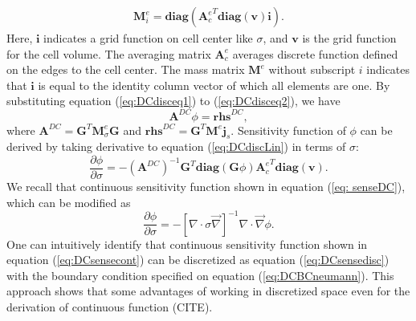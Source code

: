 \documentclass[a4paper, 11pt]{article}
\renewcommand{\div}{\nabla\cdot}
\newcommand{\grad}{\vec \nabla}
\newcommand{\dgrad}{{\mathbf G}}
\newcommand{\Ace}{{\mathbf A_c^e}}
\newcommand{\diag}{\mathbf{diag}}
\newcommand{\M}{{\mathbf M}}
\newcommand{\MeSig}{{\M^e_\sigma}}
\newcommand{\Me}{{\M^e}}
\renewcommand {\dj}  { {\mathbf{j} } }
\newcommand{\vol}{\mathbf{v}}
\newcommand{\A}{\mathbf{A}}
\begin{document}
\begin{align}
  \mathbf{M}^e_i = \diag(\Ace^T\diag(\vol)\mathbf{i}).
\end{align}
Here, $\mathbf{i}$ indicates a grid function on cell center like $\sigma$, and $\vol$ is the grid function for the cell volume. The averaging matrix $\Ace$ averages discrete function defined on the edges to the cell center. The mass matrix $\Me$ without subscript $i$ indicates that $\mathbf{i}$ is equal to the identity column vector of which all elements are one. By substituting equation (\ref{eq:DCdisceq1}) to (\ref{eq:DCdisceq2}), we have
\begin{equation}
  \A^{DC}\phi = \mathbf{rhs}^{DC},
  \label{eq:DCdiscLin}
\end{equation}
where $\A^{DC} = \dgrad^T \MeSig\dgrad$ and $\mathbf{rhs}^{DC} = \dgrad^T \Me\dj_s$. Sensitivity function of $\phi$ can be derived by taking derivative to equation (\ref{eq:DCdiscLin}) in terms of $\sigma$:
\begin{equation}
  \frac{\partial \phi}{\partial \sigma} = -(\A^{DC})^{-1}\dgrad^T\diag(\dgrad\phi)\Ace^T\diag(\vol).
  \label{eq:DCsensedisc}
\end{equation}
We recall that continuous sensitivity function shown in equation (\ref{eq: senseDC}), which can be modified as
\begin{equation}
  \frac{\partial \phi}{\partial \sigma} = -[\div\sigma\grad]^{-1}\div\grad\phi.
  \label{eq:DCsensecont}
\end{equation}
One can intuitively identify that continuous sensitivity function shown in equation (\ref{eq:DCsensecont}) can be discretized as equation (\ref{eq:DCsensedisc}) with the boundary condition specified on equation (\ref{eq:DCBCneumann}). This approach shows that some advantages of working in discretized space even for the derivation of continuous function (CITE).


\clearpage


\end{document}

